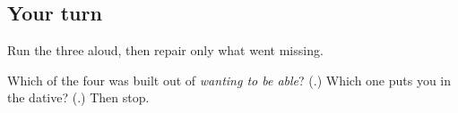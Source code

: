 \subsection*{Your turn}
Run the three aloud, then repair only what went missing.

\begin{tcolorbox}[breakable,colback=teal!4,colframe=teal!35!black,title={Before you move on}]
Which of the four was built out of \emph{wanting to be able}? (\textbf{}.) Which one puts you in the dative? (\textbf{}.) Then stop.
\end{tcolorbox}
